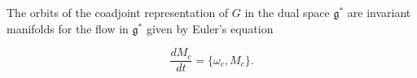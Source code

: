 The orbits of the coadjoint representation of $G$ in the dual space $\mathfrak{g}^*$ are invariant manifolds for the flow in $\mathfrak{g}^*$ given by Euler's equation

$$\frac{dM_c}{dt} = \{\omega_c, M_c\}.$$

